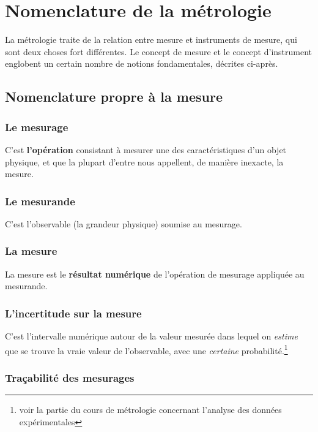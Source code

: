 \chapter{Nomenclature de la métrologie}

La métrologie traite de la relation entre mesure et instruments de mesure, qui sont deux choses fort différentes. Le concept de mesure et le concept d'instrument englobent un certain nombre de notions fondamentales, décrites ci-après.

\section{Nomenclature propre à la mesure}

\subsection{Le mesurage}

C'est \textbf{l'opération} consistant à mesurer une des caractéristiques d'un objet physique, et que la plupart d'entre nous appellent, de manière inexacte, la mesure.

\subsection{Le mesurande}

C'est l'observable (la grandeur physique) soumise au mesurage.

\subsection{La mesure}

La mesure est le \textbf{résultat numérique} de l'opération de mesurage appliquée au mesurande.

\subsection{L'incertitude sur la mesure}

C'est l'intervalle numérique autour de la valeur mesurée dans lequel on \textit{estime} que se trouve la vraie valeur de l'observable, avec une \textit{certaine} probabilité.\footnote{voir la partie du cours de métrologie concernant l'analyse des données expérimentales}

\subsection{Traçabilité des mesurages}

